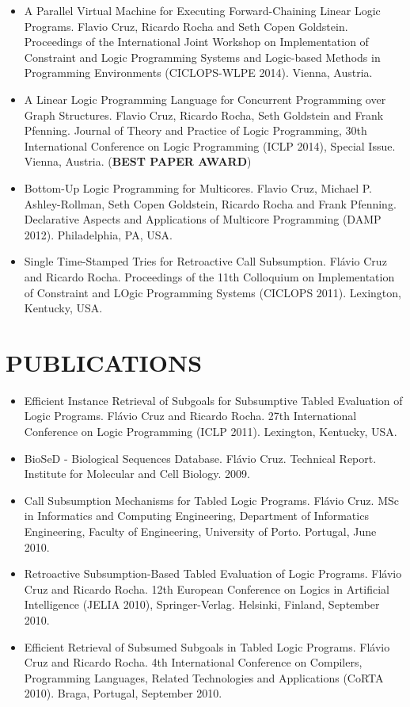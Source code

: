 \documentclass[margin]{res}
\begin{document}
\begin{resume}
\begin{itemize}
      \item A Parallel Virtual Machine for Executing Forward-Chaining Linear Logic Programs. Flavio Cruz, Ricardo Rocha and Seth Copen Goldstein. Proceedings of the International Joint Workshop on Implementation of Constraint and Logic Programming Systems and Logic-based Methods in Programming Environments (CICLOPS-WLPE 2014). Vienna, Austria.
      \item A Linear Logic Programming Language for Concurrent Programming over Graph Structures. Flavio Cruz, Ricardo Rocha, Seth Goldstein and Frank Pfenning. Journal of Theory and Practice of Logic Programming, 30th International Conference on Logic Programming (ICLP 2014), Special Issue. Vienna, Austria. (\textbf{BEST PAPER AWARD})
      \item Bottom-Up Logic Programming for Multicores. Flavio Cruz, Michael P. Ashley-Rollman, Seth Copen Goldstein, Ricardo Rocha and Frank Pfenning. Declarative Aspects and Applications of Multicore Programming (DAMP 2012). Philadelphia, PA, USA.
      \item Single Time-Stamped Tries for Retroactive Call Subsumption. Flávio Cruz and Ricardo Rocha. Proceedings of the 11th Colloquium on Implementation of Constraint and LOgic Programming Systems (CICLOPS 2011). Lexington, Kentucky, USA.
\end{itemize}
\pagebreak
\section{PUBLICATIONS}
\begin{itemize}
      \item Efficient Instance Retrieval of Subgoals for Subsumptive Tabled Evaluation of Logic Programs. Flávio Cruz and Ricardo Rocha. 27th International Conference on Logic Programming (ICLP 2011). Lexington, Kentucky, USA.
      \item BioSeD - Biological Sequences Database. Flávio Cruz. Technical Report. Institute for Molecular and Cell Biology. 2009.
      \item Call Subsumption Mechanisms for Tabled Logic Programs. Flávio Cruz. MSc in Informatics and Computing Engineering, Department of Informatics Engineering, Faculty of Engineering, University of Porto. Portugal, June 2010.
      \item Retroactive Subsumption-Based Tabled Evaluation of Logic Programs.
      Flávio Cruz and Ricardo Rocha. 12th European Conference on Logics in Artificial Intelligence (JELIA 2010), Springer-Verlag. Helsinki, Finland, September 2010.
      \item Efficient Retrieval of Subsumed Subgoals in Tabled Logic Programs.
      Flávio Cruz and Ricardo Rocha. 4th International Conference on Compilers, Programming Languages, Related Technologies and Applications (CoRTA 2010). Braga, Portugal, September 2010.
   \end{itemize}



\end{resume}
\end{document}
